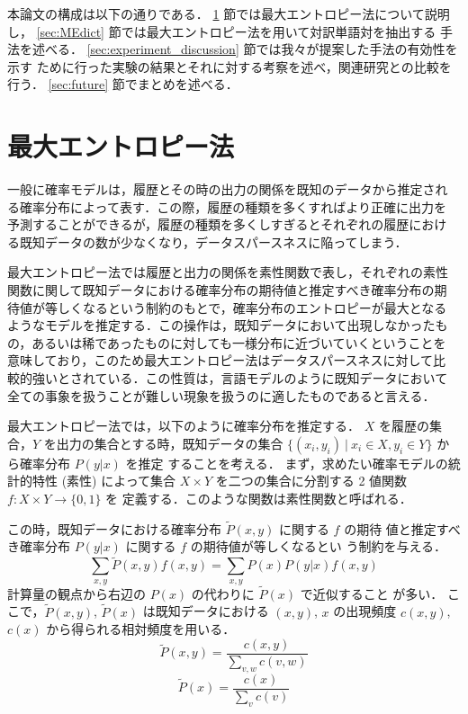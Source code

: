 本論文の構成は以下の通りである．
\ref{sec:ME_method} 節では最大エントロピー法について説明し，
\ref{sec:MEdict} 節では最大エントロピー法を用いて対訳単語対を抽出する
手法を述べる．
\ref{sec:experiment_discussion} 節では我々が提案した手法の有効性を示す
ために行った実験の結果とそれに対する考察を述べ，関連研究との比較を行う．
\ref{sec:future} 節でまとめを述べる．

\section{最大エントロピー法}
\label{sec:ME_method}

一般に確率モデルは，履歴とその時の出力の関係を既知のデータから推定され
る確率分布によって表す．この際，履歴の種類を多くすればより正確に出力を
予測することができるが，履歴の種類を多くしすぎるとそれぞれの履歴におけ
る既知データの数が少なくなり，データスパースネスに陥ってしまう．

最大エントロピー法では履歴と出力の関係を素性関数で表し，それぞれの素性
関数に関して既知データにおける確率分布の期待値と推定すべき確率分布の期
待値が等しくなるという制約のもとで，確率分布のエントロピーが最大となる
ようなモデルを推定する．この操作は，既知データにおいて出現しなかったも
の，あるいは稀であったものに対しても一様分布に近づいていくということを
意味しており，このため最大エントロピー法はデータスパースネスに対して比
較的強いとされている．この性質は，言語モデルのように既知データにおいて
全ての事象を扱うことが難しい現象を扱うのに適したものであると言える．

最大エントロピー法では，以下のように確率分布を推定する．
$X$ を履歴の集合，$Y$ を出力の集合とする時，既知データの集合
$\{(x_i,y_i)\ |\  x_i \in X, y_i \in Y\}$ から確率分布 $P(y|x)$ を推定
することを考える．
まず，求めたい確率モデルの統計的特性 (素性) によって集合 $X \times Y$
を二つの集合に分割する 2 値関数 $f: X \times Y \rightarrow \{0,1\}$ を
定義する．このような関数は素性関数と呼ばれる．

この時，既知データにおける確率分布 $\tilde{P}(x,y)$ に関する $f$ の期待
値と推定すべき確率分布 $P(y|x)$ に関する $f$ の期待値が等しくなるとい
う制約を与える．
\begin{equation}
  \label{eq:constraint}
  \sum_{x,y} \tilde{P}(x,y) f(x,y) = \sum_{x,y} P(x) P(y|x) f(x,y)
\end{equation}
計算量の観点から右辺の $P(x)$ の代わりに $\tilde{P}(x)$ で近似すること
が多い．
ここで，$\tilde{P}(x,y)$, $\tilde{P}(x)$ は既知データにおける $(x,y)$,
$x$ の出現頻度 $c(x,y)$, $c(x)$ から得られる相対頻度を用いる．
\[ \tilde{P}(x,y) = \frac{c(x,y)}{\sum_{v,w} c(v,w)} \]
\[ \tilde{P}(x) = \frac{c(x)}{\sum_v c(v)} \]

